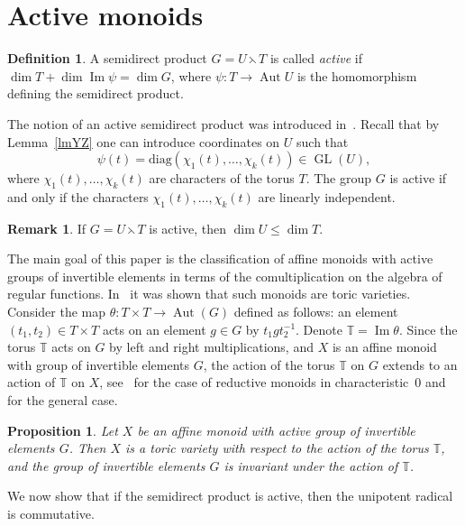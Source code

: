 \documentclass[a4paper, 11pt]{amsart}
\theoremstyle{plain}
\newtheorem{proposition}[theorem]{Proposition}
\theoremstyle{remark}
\theoremstyle{definition}
\newtheorem{definition}[theorem]{Definition}
\newtheorem{remark}[theorem]{Remark}
\newcommand{\TT}{\mathbb{T}}
\renewcommand{\Im}{\mathop{\text{Im}}}
\DeclareMathOperator{\GL}{GL}
\DeclareMathOperator{\Aut}{Aut}
\begin{document}
\section{Active monoids}\label{sec:actmon}
\begin{definition}
A semidirect product $G = U \leftthreetimes T$ is called \textit{active} if $\dim T + \dim \Im \psi = \dim G$, where $\psi\colon T \to \Aut U$ is the homomorphism defining the semidirect product.
\end{definition}

The notion of an active semidirect product was introduced in~\cite{YZ}. Recall that by Lemma~\ref{lmYZ} one can introduce coordinates on $U$ such that $$\psi(t) = \mathrm{diag}(\chi_1(t), \ldots, \chi_k(t)) \in \GL(U),$$ where $\chi_1(t), \ldots, \chi_k(t)$ are characters of the torus $T$. The group $G$ is active if and only if the characters $\chi_1(t), \ldots, \chi_k(t)$ are linearly independent.

\begin{remark}
If $G = U \leftthreetimes T$ is active, then $\dim U \leq \dim T$.
\end{remark}

The main goal of this paper is the classification of affine monoids with active groups of invertible elements in terms of the comultiplication on the algebra of regular functions. In~\cite{YZ} it was shown that such monoids are toric varieties. Consider the map $\theta\colon T \times T \rightarrow \Aut(G)$ defined as follows: an element $(t_1, t_2) \in T \times T$ acts on an element $g \in G$ by $t_1 g t_2^{-1}$. Denote $\TT = \Im \theta$. Since the torus $\TT$ acts on $G$ by left and right multiplications, and $X$ is an affine monoid with group of invertible elements $G$, the action of the torus $\TT$ on $G$ extends to an action of $\TT$ on $X$, see~\cite[Theorem 1]{Vin} for the case of reductive monoids in characteristic~$0$ and~\cite[Proposition 1]{Ri1} for the general case.

\begin{proposition}\label{pr:toric} \cite[Proposition 2]{YZ} 
Let $X$ be an affine monoid with active group of invertible elements $G$. Then $X$ is a toric variety with respect to the action of the torus $\TT$, and the group of invertible elements $G$ is invariant under the action of $\TT$.
\end{proposition}

We now show that if the semidirect product is active, then the unipotent radical is commutative.
\end{document}
